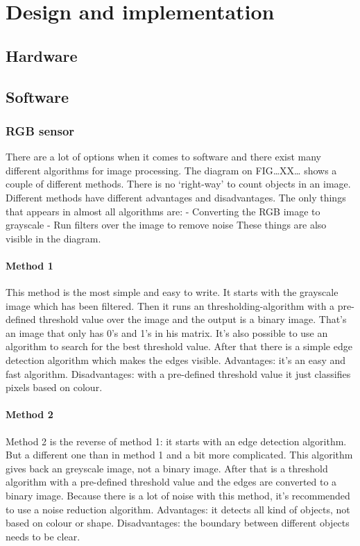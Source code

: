 \documentclass{article}
\begin{document}
\section{Design and implementation}
\subsection{Hardware}
\subsection{Software}
\subsubsection{RGB sensor}

There are a lot of options when it comes to software and there exist many different algorithms for image processing. The diagram on FIG…XX… shows a couple of different methods. There is no ‘right-way’ to count objects in an image. Different methods have different advantages and disadvantages. The only things that appears in almost all algorithms are:
-	Converting the RGB image to grayscale
-	Run filters over the image to remove noise
These things are also visible in the diagram.
\paragraph{Method 1}
This method is the most simple and easy to write. It starts with the grayscale image which has been filtered. Then it runs an thresholding-algorithm with a pre-defined threshold value over the image and the output is a binary image. That’s an image that only has 0’s and 1’s in his matrix.  It’s also possible to use an algorithm to search for the best threshold value.  After that there is a simple edge detection algorithm which makes the edges visible. 
Advantages: it’s an easy and fast algorithm.
Disadvantages: with a pre-defined threshold value it just classifies pixels based on colour. 
\paragraph{Method 2}
Method 2 is the reverse of method 1: it starts with an edge detection algorithm. But a different one than in method 1 and a bit more complicated. This algorithm gives back an greyscale image, not a binary image. After that is a threshold algorithm with a pre-defined threshold value and the edges are converted to a binary image. Because there is a lot of noise with this method, it's recommended to use a noise reduction algorithm. 
Advantages: it detects all kind of objects, not based on colour or shape.
Disadvantages: the boundary between different objects needs to be clear.
\end{document}
